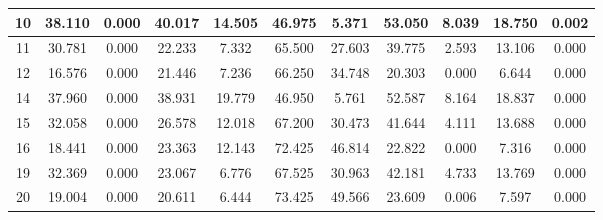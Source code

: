 \begin{table}[]
\begin{tabular}{|c|cc|cc|cc|cc|cc|}
10 & 38.110 & \cellcolor[HTML]{EFEFEF}0.000 & 40.017 & \cellcolor[HTML]{EFEFEF}14.505 & 46.975 & \cellcolor[HTML]{EFEFEF}5.371 & 53.050 & \cellcolor[HTML]{EFEFEF}8.039 & 18.750 & \cellcolor[HTML]{EFEFEF}0.002 \\ \hline
11 & 30.781 & \cellcolor[HTML]{EFEFEF}0.000 & 22.233 & \cellcolor[HTML]{EFEFEF}7.332 & 65.500 & \cellcolor[HTML]{EFEFEF}27.603 & 39.775 & \cellcolor[HTML]{EFEFEF}2.593 & 13.106 & \cellcolor[HTML]{EFEFEF}0.000 \\ \hline
12 & 16.576 & \cellcolor[HTML]{EFEFEF}0.000 & 21.446 & \cellcolor[HTML]{EFEFEF}7.236 & 66.250 & \cellcolor[HTML]{EFEFEF}34.748 & 20.303 & \cellcolor[HTML]{EFEFEF}0.000 & 6.644 & \cellcolor[HTML]{EFEFEF}0.000 \\ \hline
14 & 37.960 & \cellcolor[HTML]{EFEFEF}0.000 & 38.931 & \cellcolor[HTML]{EFEFEF}19.779 & 46.950 & \cellcolor[HTML]{EFEFEF}5.761 & 52.587 & \cellcolor[HTML]{EFEFEF}8.164 & 18.837 & \cellcolor[HTML]{EFEFEF}0.000 \\ \hline
15 & 32.058 & \cellcolor[HTML]{EFEFEF}0.000 & 26.578 & \cellcolor[HTML]{EFEFEF}12.018 & 67.200 & \cellcolor[HTML]{EFEFEF}30.473 & 41.644 & \cellcolor[HTML]{EFEFEF}4.111 & 13.688 & \cellcolor[HTML]{EFEFEF}0.000 \\ \hline
16 & 18.441 & \cellcolor[HTML]{EFEFEF}0.000 & 23.363 & \cellcolor[HTML]{EFEFEF}12.143 & 72.425 & \cellcolor[HTML]{EFEFEF}46.814 & 22.822 & \cellcolor[HTML]{EFEFEF}0.000 & 7.316 & \cellcolor[HTML]{EFEFEF}0.000 \\ \hline
19 & 32.369 & \cellcolor[HTML]{EFEFEF}0.000 & 23.067 & \cellcolor[HTML]{EFEFEF}6.776 & 67.525 & \cellcolor[HTML]{EFEFEF}30.963 & 42.181 & \cellcolor[HTML]{EFEFEF}4.733 & 13.769 & \cellcolor[HTML]{EFEFEF}0.000 \\ \hline
20 & 19.004 & \cellcolor[HTML]{EFEFEF}0.000 & 20.611 & \cellcolor[HTML]{EFEFEF}6.444 & 73.425 & \cellcolor[HTML]{EFEFEF}49.566 & 23.609 & \cellcolor[HTML]{EFEFEF}0.006 & 7.597 & \cellcolor[HTML]{EFEFEF}0.000 \\ \hline
\end{tabular}
\end{table}
